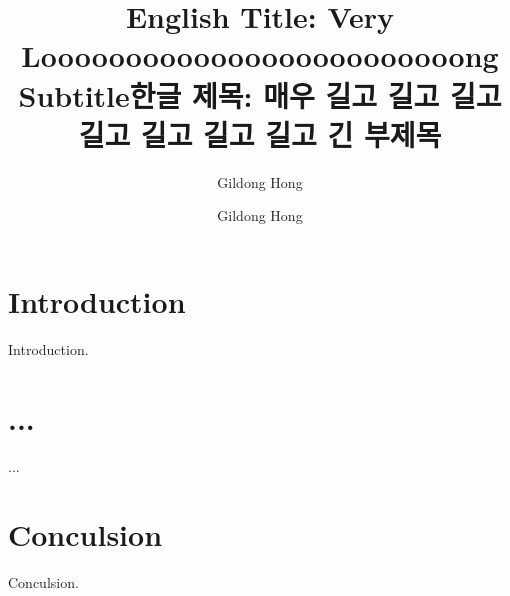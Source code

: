 \documentclass[oneside,phd]{snueethesis}
\title{English Title: Very\\ Looooooooooooooooooooooooong Subtitle}
\title*{한글 제목: 매우 길고 길고 길고\\ %
	길고 길고 길고 길고 긴 부제목}
\author{Gildong Hong}
\author*{Gildong Hong} %
\begin{document}
\makefrontcover
\makefrontcover
\makeapproval

\cleardoublepage
{}

\begin{abstract}
\noindent
\lipsum[1-3]
\end{abstract}

\tableofcontents
\listoffigures
\listoftables

\cleardoublepage
{}

\chapter{Introduction}
Introduction.

\chapter{...}
...

\chapter{Conculsion}
Conculsion.
\end{document}
